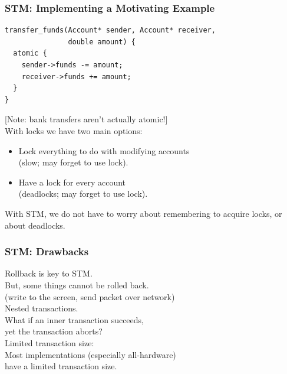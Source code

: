 \documentclass[aspectratio=43]{beamer}
\newenvironment{changemargin}[1]{%
  \begin{list}{}{%
    \setlength{\topsep}{0pt}%
    \setlength{\leftmargin}{#1}%
    \setlength{\rightmargin}{1em}
    \setlength{\listparindent}{\parindent}%
    \setlength{\itemindent}{\parindent}%
    \setlength{\parsep}{\parskip}%
  }%
  \item[]}{\end{list}}
\begin{document}
\begin{frame}[fragile]
  \frametitle{STM: Implementing a Motivating Example}

\begin{changemargin}{2cm}
  \begin{lstlisting}
transfer_funds(Account* sender, Account* receiver,
               double amount) {
  atomic {
    sender->funds -= amount;
    receiver->funds += amount;
  }
}
  \end{lstlisting}
  [Note: bank transfers aren't actually atomic!]\\[1em]

    With locks we have two main options:
      \begin{itemize}
        \item Lock everything to do with modifying accounts \\ 
\qquad (slow; may forget to use lock).
        \item Have a lock for every account \\ 
\qquad (deadlocks; may forget to use lock).
      \end{itemize}
    With STM, we do not have to worry about remembering to acquire locks,
      or about deadlocks.
\end{changemargin}
\end{frame}

\begin{frame}
  \frametitle{STM: Drawbacks}

\begin{changemargin}{2cm}
    Rollback is key to STM. \\
     \qquad But, some things cannot be rolled back. \\
     \qquad (write to the screen, send packet over network)\\[1em]

    Nested transactions. \\
     \qquad What if an inner transaction succeeds, \\ yet the
      transaction aborts? \\[1em]

    Limited transaction size: \\
 \qquad Most implementations (especially
    all-hardware) \\ have a limited transaction size.
\end{changemargin}
\end{frame}
\end{document}
